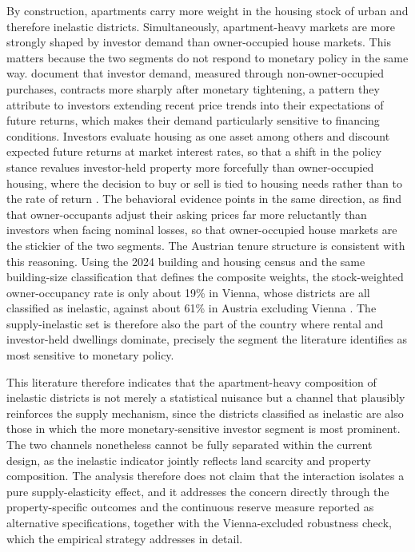 \documentclass[a4paper,12pt, headsepline]{scrartcl}
\numberwithin{equation}{section}
\begin{document}
By construction, apartments carry more weight in the housing stock of urban and therefore inelastic districts. Simultaneously, apartment-heavy markets are more strongly shaped by investor demand than owner-occupied house markets. This matters because the two segments do not respond to monetary policy in the same way. \citet{biljanovska2025} document that investor demand, measured through non-owner-occupied purchases, contracts more sharply after monetary tightening, a pattern they attribute to investors extending recent price trends into their expectations of future returns, which makes their demand particularly sensitive to financing conditions. Investors evaluate housing as one asset among others and discount expected future returns at market interest rates, so that a shift in the policy stance revalues investor-held property more forcefully than owner-occupied housing, where the decision to buy or sell is tied to housing needs rather than to the rate of return \citep{reservebankofaustralia2020}. The behavioral evidence points in the same direction, as \citet{genesove2001} find that owner-occupants adjust their asking prices far more reluctantly than investors when facing nominal losses, so that owner-occupied house markets are the stickier of the two segments. The Austrian tenure structure is consistent with this reasoning. Using the 2024 building and housing census and the same building-size classification that defines the composite weights, the stock-weighted owner-occupancy rate is only about 19\% in Vienna, whose districts are all classified as inelastic, against about 61\% in Austria excluding Vienna \citep{statistikaustria_housingcensus}. The supply-inelastic set is therefore also the part of the country where rental and investor-held dwellings dominate, precisely the segment the literature identifies as most sensitive to monetary policy.

This literature therefore indicates that the apartment-heavy composition of inelastic districts is not merely a statistical nuisance but a channel that plausibly reinforces the supply mechanism, since the districts classified as inelastic are also those in which the more monetary-sensitive investor segment is most prominent. The two channels nonetheless cannot be fully separated within the current design, as the inelastic indicator jointly reflects land scarcity and property composition. The analysis therefore does not claim that the interaction isolates a pure supply-elasticity effect, and it addresses the concern directly through the property-specific outcomes and the continuous reserve measure reported as alternative specifications, together with the Vienna-excluded robustness check, which the empirical strategy addresses in detail.
\end{document}
